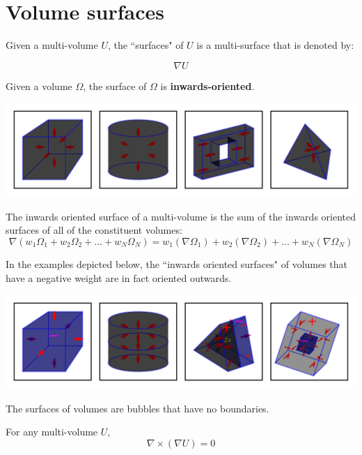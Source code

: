 \section{Volume surfaces}

Given a multi-volume \(U\), the ``surfaces" of \(U\) is a multi-surface that is denoted by: 

\[\nabla U\]

Given a volume \(\Omega\), the surface of \(\Omega\) is {\bf inwards-oriented}. 

\begin{center}
\includegraphics[width = \textwidth]{Boundaries/Volume_inwards_oriented_surfaces/volume_surface_examples}
\end{center}

The inwards oriented surface of a multi-volume is the sum of the inwards oriented surfaces of all of the constituent volumes:
\[\nabla (w_1 \Omega_1 + w_2 \Omega_2 + ... + w_N \Omega_N)
= w_1(\nabla \Omega_1) + w_2(\nabla \Omega_2) + ... + w_N(\nabla \Omega_N)\]

In the examples depicted below, the ``inwards oriented surfaces" of volumes that have a negative weight are in fact oriented outwards.

\begin{center}
\includegraphics[width = \textwidth]{Boundaries/Volume_inwards_oriented_surfaces/volume_surface_examples_2}
\end{center}

The surfaces of volumes are bubbles that have no boundaries. 
\begin{thm}
For any multi-volume \(U\), 
\[\nabla \times (\nabla U) = 0\]
\end{thm} 

